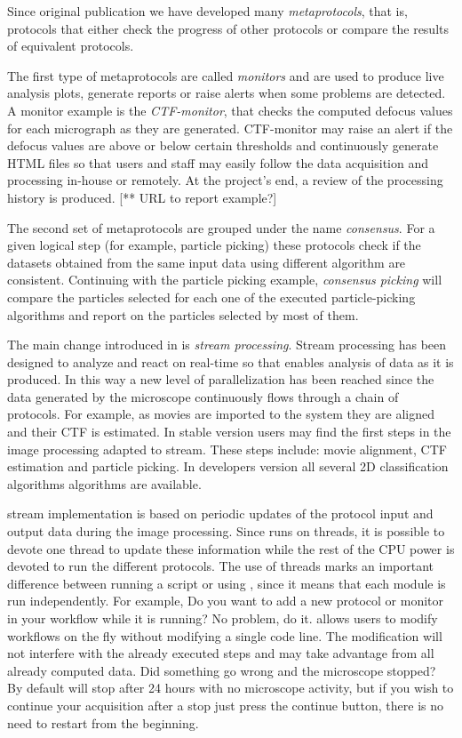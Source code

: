 Since \scipion original publication we have developed many \emph{metaprotocols}, that is, 
protocols that either check the progress of other protocols or compare the results of equivalent protocols.

The first type of metaprotocols are called \emph{monitors} and are used to produce live analysis plots, generate reports or raise alerts when some problems are detected. A monitor example is the \emph{CTF-monitor}, that checks the computed defocus values for
each micrograph as they are generated. CTF-monitor may raise an alert if the defocus values are above or below certain thresholds and continuously generate HTML files so that users and staff may easily follow the data acquisition and processing in-house or remotely. At the project's end, a review of the processing history is produced. [** URL to report example?]

The second set of metaprotocols are grouped under the name \emph{consensus}. For a given logical step (for example, particle picking) these protocols check if the datasets obtained from the same input data using different algorithm are consistent. Continuing with the particle picking example, \emph{consensus picking} will compare the particles selected for each one of the executed particle-picking algorithms and report on the particles selected by most of them.

The main change introduced in \scipion is \emph{stream processing}. Stream processing has been designed to analyze and react on real-time so that enables analysis of data as it is produced.
In this way a new level of parallelization has been reached since the  data generated by the microscope continuously flows through a chain of protocols. For example, as movies are imported to the system they are aligned and their CTF is estimated. In \scipion stable version users may find  the first steps in the image processing adapted to stream. These steps include: movie alignment, CTF estimation and particle picking. In \scipion developers version all several 2D classification algorithms algorithms are available.

\scipion stream implementation is based on periodic updates of the protocol input and output data during the image processing. Since \scipion runs on threads, it is possible to devote one thread to update these information while the rest of the CPU power is devoted to run the different protocols. The use of threads marks an important difference between running a script or using \scipion, since it means that each module is run independently. For example, Do you want to add a new protocol or monitor in your workflow while it is running? No problem, do it. \scipion allows users to modify  workflows on the fly without modifying a single code line. The modification will not interfere with the already executed steps and may take advantage from all already computed data. Did something go wrong and the microscope stopped? By default \scipion will stop after 24 hours with no microscope activity, but if you wish to continue your acquisition after a stop just press the continue button, there is no need to restart from the beginning. 

